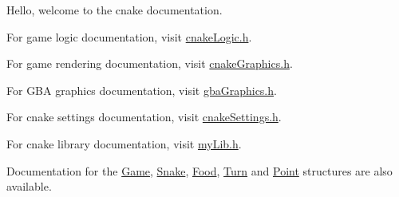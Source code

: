 Hello, welcome to the cnake documentation.

For game logic documentation, visit \hyperlink{cnake_logic_8h}{cnake\+Logic.\+h}.

For game rendering documentation, visit \hyperlink{cnake_graphics_8h}{cnake\+Graphics.\+h}.

For G\+BA graphics documentation, visit \hyperlink{gba_graphics_8h}{gba\+Graphics.\+h}.

For cnake settings documentation, visit \hyperlink{cnake_settings_8h}{cnake\+Settings.\+h}.

For cnake library documentation, visit \hyperlink{my_lib_8h}{my\+Lib.\+h}.

Documentation for the \hyperlink{struct_game}{Game}, \hyperlink{struct_snake}{Snake}, \hyperlink{struct_food}{Food}, \hyperlink{struct_turn}{Turn} and \hyperlink{struct_point}{Point} structures are also available. 